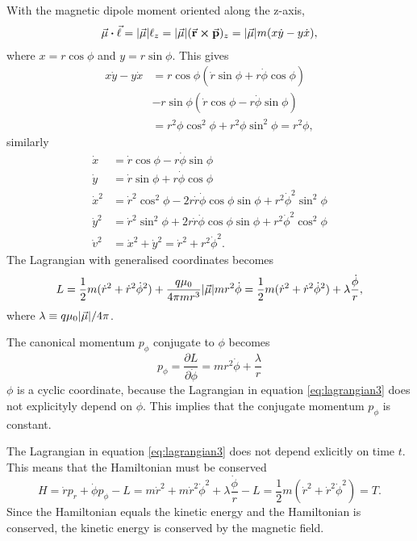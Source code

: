 \documentclass[11pt]{amsart}
\begin{document}
With the magnetic dipole moment oriented along the z-axis, 
\begin{align*}
\va{\mu}\vdot\va{\ell} = \abs{\va{\mu}}\ell_z = \abs{\va{\mu}}(\va{r}\cp\va{p})_z = \abs{\va{\mu}}m(x\dot{y}-y\dot{x}),
\end{align*} 
where $x = r\cos\phi$ and $y = r\sin\phi$. This gives
\begin{align*}
x\dot{y} - y\dot{x} &= r\cos\phi(\dot{r}\sin\phi + r\dot{\phi}\cos\phi) \\
					&- r\sin\phi(\dot{r}\cos\phi - r\dot{\phi}\sin\phi) \\
					&= r^2\phi\cos^2\phi + r^2\phi\sin^2\phi = r^2\phi,
\end{align*} 
similarly
\begin{align*}
\dot{x} &= \dot{r}\cos\phi - r\dot{\phi}\sin\phi \\
\dot{y} &= \dot{r}\sin\phi + r\dot{\phi}\cos\phi \\
\dot{x}^2 &= \dot{r}^2\cos^2\phi - 2r\dot{r}\dot{\phi}\cos\phi\sin\phi + r^2\dot{\phi}^2\sin^2\phi \\
\dot{y}^2 &= \dot{r}^2\sin^2\phi + 2r\dot{r}\dot{\phi}\cos\phi\sin\phi + r^2\dot{\phi}^2\cos^2\phi \\
\dot{v}^2 &= \dot{x}^2 + \dot{y}^2 = \dot{r}^2 + r^2\dot{\phi}^2.
\end{align*}
The Lagrangian with generalised coordinates becomes
\begin{equation}
\label{eq:lagrangian3}
L = \frac{1}{2}m(\dot{r}^2 + \dot{r}^2\dot{\phi}^2) + \frac{q\mu_0}{4\pi mr^3}\abs{\va{\mu}}mr^2\dot{\phi} = \frac{1}{2}m(\dot{r}^2 + \dot{r}^2\dot{\phi}^2) + \lambda\frac{\dot{\phi}}{r},
\end{equation}
where $\lambda \equiv q\mu_0\abs{\va{\mu}}/4\pi$. 

The canonical momentum $p_\phi$ conjugate to $\phi$ becomes
\begin{equation}
\label{eq:conjmomphi}
p_\phi = \frac{\partial L}{\partial \dot{\phi}} = mr^2\dot{\phi} + \frac{\lambda}{r}
\end{equation}
$\phi$ is a cyclic coordinate, because the Lagrangian in equation \ref{eq:lagrangian3} does not explicityly depend on $\phi$. This implies that the conjugate momentum $p_\phi$ is constant. 

The Lagrangian in equation \ref{eq:lagrangian3} does not depend exlicitly on time $t$. This means that the Hamiltonian must be conserved
\begin{equation}
H = \dot{r}p_r + \dot{\phi}p_\phi - L = m\dot{r}^2 + m\dot{r}^2\dot{\phi}^2 + \lambda\frac{\dot{\phi}}{r} - L = \frac{1}{2}m(\dot{r}^2 + \dot{r}^2\dot{\phi}^2) = T.
\end{equation}
Since the Hamiltonian equals the kinetic energy and the Hamiltonian is conserved, the kinetic energy is conserved by the magnetic field.
\end{document}
